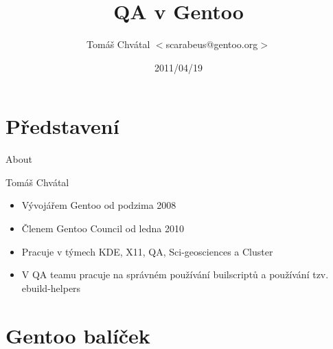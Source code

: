 \documentclass{beamer}
\title{QA v Gentoo}
\author[Tomáš Chvátal]{Tomáš Chvátal $<$scarabeus@gentoo.org$>$}
\date{2011/04/19}
\begin{document}
\frame{\titlepage}
\section{Představení}
\begin{frame}{About}
	\begin{center}Tomáš Chvátal\end{center}
	\begin{itemize}
		\item Vývojářem Gentoo od podzima 2008
		\item Členem Gentoo Council od ledna 2010
		\item Pracuje v týmech KDE, X11, QA, Sci-geosciences a Cluster
		\item V QA teamu pracuje na správném používání builscriptů a používání
tzv. ebuild-helpers
	\end{itemize}
\end{frame}
\section{Gentoo balíček}
\end{document}
